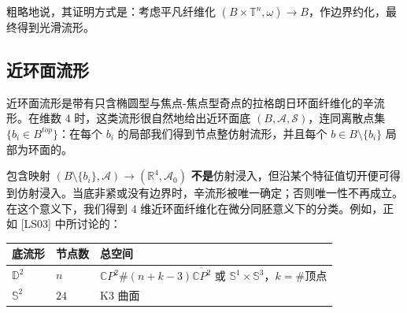 粗略地说，其证明方式是：考虑平凡纤维化 $(B\times\mathbb{T}^n,\omega)\to B$，作边界约化，最终得到光滑流形。

\subsection{近环面流形}

近环面流形是带有只含椭圆型与焦点-焦点型奇点的拉格朗日环面纤维化的辛流形。在维数 $4$ 时，这类流形很自然地给出近环面底 $(B,\mathcal{A},\mathcal{S})$，连同离散点集 $\{b_i\in B^{top}\}$：在每个 $b_i$ 的局部我们得到节点整仿射流形，并且每个 $b\in B\setminus\{b_i\}$ 局部为环面的。


包含映射 $(B\setminus\{b_i\},\mathcal{A})\to (\mathbb{R}^4,\mathcal{A}_0)$ \textbf{不是}仿射浸入，但沿某个特征值切开便可得到仿射浸入。当底非紧或没有边界时，辛流形被唯一确定；否则唯一性不再成立。在这个意义下，我们得到 $4$ 维近环面纤维化在微分同胚意义下的分类。例如，正如 [LS03] 中所讨论的：


\begin{table}[htbp]
\centering
\small
\begin{tabular}{lll}
\toprule
底流形 & 节点数 & 总空间 \\
\midrule
$\mathbb{D}^2$ & $n$ & $\mathbb{C}P^2\#(n+k-3)\overline{\mathbb{C}P^2}$ 或 $\mathbb{S}^1\times\mathbb{S}^3$，$k=\#\text{顶点}$ \\
$\mathbb{S}^2$ & $24$ & K3 曲面 \\
\bottomrule
\end{tabular}
\end{table}

